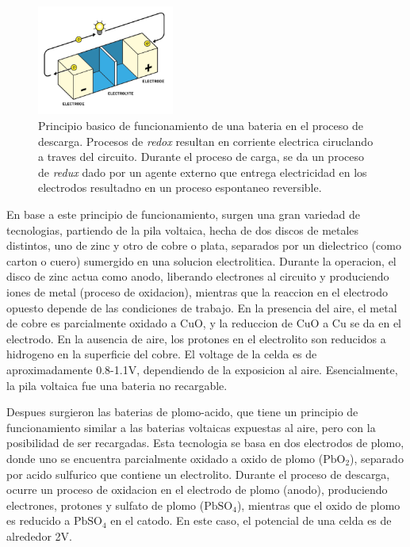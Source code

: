 \documentclass[10pt,a4paper]{article}
\begin{document}
    \begin{figure}[h!]
        \begin{center}
            \includegraphics[width=0.4\textwidth]{batt_func_ppr.png}
        \end{center}
        \caption{Principio basico de funcionamiento de una bateria en el
        proceso de descarga. Procesos de \emph{redox} resultan en corriente
        electrica ciruclando a traves del circuito. Durante el proceso de
        carga, se da un proceso de \emph{redux} dado por un agente externo 
        que entrega electricidad en los electrodos resultadno en un proceso
        espontaneo reversible.}
        \label{batt_wk_ppl}
    \end{figure}

    \clearpage

    \noindent En base a este principio de funcionamiento, surgen una gran 
    variedad de tecnologias, partiendo de la pila voltaica, hecha de dos discos
    de metales distintos, uno de zinc y otro de cobre o plata, separados por un
    dielectrico (como carton o cuero) sumergido en una solucion electrolitica.
    Durante la operacion, el disco de zinc actua como anodo, liberando
    electrones al circuito y produciendo iones de metal (proceso de oxidacion),
    mientras que la reaccion en el electrodo opuesto depende de las condiciones
    de trabajo. En la presencia del aire, el metal de cobre es parcialmente
    oxidado a CuO, y la reduccion de CuO a Cu se da en el electrodo. En la
    ausencia de aire, los protones en el electrolito son reducidos a hidrogeno
    en la superficie del cobre. El voltage de la celda es de aproximadamente
    0.8-1.1V, dependiendo de la exposicion al aire. Esencialmente, la pila
    voltaica fue una bateria no recargable. 
    
    \noindent Despues surgieron las baterias de plomo-acido, que tiene un 
    principio de funcionamiento similar a las baterias voltaicas expuestas al 
    aire, pero con la posibilidad de ser recargadas. Esta tecnologia se basa en 
    dos electrodos de plomo, donde uno se encuentra parcialmente oxidado a 
    oxido de plomo ($\mathrm{PbO_2}$), separado por acido sulfurico que contiene un 
    electrolito. Durante el proceso de descarga, ocurre un proceso de oxidacion 
    en el electrodo de plomo (anodo), produciendo electrones, protones y 
    sulfato de plomo ($\mathrm{PbSO_4}$), mientras que el oxido de plomo es 
    reducido a $\mathrm{PbSO_4}$ en el catodo. En este caso, el potencial de 
    una celda es de alrededor 2V.
    
\end{document}
